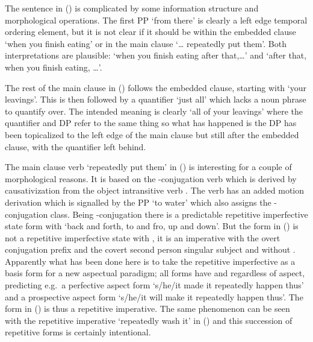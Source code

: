 The sentence in (\lastx) is complicated by some information structure and morphological operations.
The first PP  ‘from there’ is clearly a left edge temporal ordering element, but it is not clear if it should be within the embedded clause  ‘when you finish eating’ or in the main clause  ‘… repeatedly put them’.
Both interpretations are plausible: ‘when you finish eating after that,…’ and ‘after that, when you finish eating, …’.

The rest of the main clause in (\lastx) follows the embedded clause, starting with  ‘your leavings’.
This is then followed by a quantifier  ‘just all’ which lacks a noun phrase to quantify over.
The intended meaning is clearly ‘all of your leavings’ where the quantifier and DP refer to the same thing so what has happened is the DP  has been topicalized to the left edge of the main clause but still after the embedded clause, with the quantifier left behind.

The main clause verb  ‘repeatedly put them’ in (\lastx) is interesting for a couple of morphological reasons.
It is based on the -conjugation verb  which is derived by causativization from the object intransitive verb .
The verb has an added motion derivation  which is signalled by the PP  ‘to water’ which also assigns the -conjugation class.
Being -conjugation there is a predictable repetitive imperfective state form with  ‘back and forth, to and fro, up and down’.
But the form in (\lastx) is not a repetitive imperfective state with , it is an imperative with the overt  conjugation prefix and the covert second person singular subject and without .
Apparently what has been done here is to take the repetitive imperfective as a basis form for a new aspectual paradigm; all forms have  and  regardless of aspect, predicting e.g.\ a perfective aspect form  ‘s/he/it made it repeatedly happen thus’ and a prospective aspect form  ‘s/he/it will make it repeatedly happen thus’.
The form  in (\lastx) is thus a repetitive imperative.
The same phenomenon can be seen with the repetitive imperative  ‘repeatedly wash it’ in (\nextx) and this succession of repetitive forms is certainly intentional.

